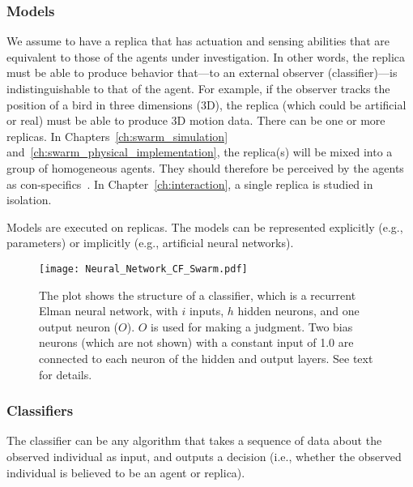 \subsubsection{Models} 

We assume to have a replica that has actuation and sensing abilities that are equivalent to those of the agents under investigation. In other words, the replica must be able to produce behavior that---to an external observer (classifier)---is indistinguishable to that of the agent. For example, if the observer tracks the position of a bird in three dimensions (3D), the replica (which could be artificial or real) must be able to produce 3D motion data. There can be one or more replicas. In Chapters~\ref{ch:swarm_simulation} and~\ref{ch:swarm_physical_implementation},  the replica(s) will be mixed into a group of homogeneous agents. They should therefore be perceived by the agents as con-specifics~\cite{J.Halloy2007}. In Chapter~\ref{ch:interaction}, a single replica is studied in isolation.

Models are executed on replicas. The models can be represented explicitly (e.g., parameters) or implicitly (e.g., artificial neural networks). %

\begin{figure}[!t]
	\centering
	\texttt{[image: Neural\_Network\_CF\_Swarm.pdf]}
	\caption{The plot shows the structure of a classifier, which is a recurrent Elman neural 
    network, with $i$ inputs, $h$ hidden neurons, and one output neuron ($O$). $O$ is used for making a judgment. Two bias neurons (which are not shown) with a constant input of 1.0 are connected to each neuron of the hidden and output layers. See text for details.}
	\label{fig:neural_network_cf_swarm}
\end{figure}

\subsubsection{Classifiers}

The classifier can be any algorithm that takes a sequence of data about the observed individual as input, and outputs a decision (i.e., whether the observed individual is believed to be an agent or replica). 

